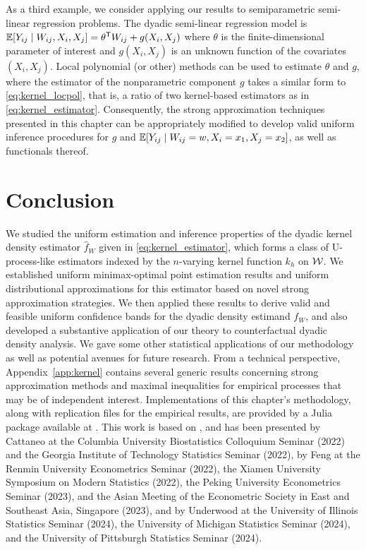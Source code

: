 As a third example, we consider applying our results to semiparametric
semi-linear regression problems. The dyadic semi-linear regression model is
$\mathbb{E}[Y_{i j} \mid W_{i j}, X_i, X_j] = \theta^{\mathsf{T}} W_{i j} + g(X_i, X_j)$
where $\theta$ is the finite-dimensional parameter of interest
and $g(X_i, X_j)$ is an unknown function of the covariates $(X_i, X_j)$.
Local polynomial (or other) methods can be used to estimate $\theta$ and $g$,
where the estimator of the nonparametric component $g$ takes a similar form to
\eqref{eq:kernel_locpol}, that is, a ratio of two kernel-based estimators as in
\eqref{eq:kernel_estimator}. Consequently, the strong approximation techniques
presented in this chapter can be appropriately modified to develop valid
uniform inference procedures for $g$ and
$\mathbb{E}[Y_{i j} \mid W_{i j}=w, X_i=x_1, X_j=x_2]$, as well as functionals thereof.

\section{Conclusion}
\label{sec:kernel_conclusion}

We studied the uniform estimation and inference properties of the dyadic kernel
density estimator $\hat{f}_W$ given in \eqref{eq:kernel_estimator}, which forms
a class of U-process-like estimators indexed by the $n$-varying kernel function
$k_h$ on $\mathcal{W}$. We established uniform minimax-optimal point estimation results
and uniform distributional approximations for this estimator based on novel
strong approximation strategies. We then applied these results to derive valid
and feasible uniform confidence bands for the dyadic density estimand $f_W$,
and also developed a substantive application of our theory to counterfactual
dyadic density analysis. We gave some other statistical applications of our
methodology as well as potential avenues for future research. From a technical
perspective, Appendix~\ref{app:kernel} contains several generic results
concerning strong approximation methods and maximal inequalities for empirical
processes that may be of independent interest. Implementations of this
chapter's methodology, along with replication files for the empirical results,
are provided by a Julia package available at
.
This work is based on \citet{cattaneo2024uniform},
and has been presented by Cattaneo at
the Columbia University Biostatistics Colloquium Seminar (2022)
and the Georgia Institute of Technology Statistics Seminar (2022),
by Feng at
the Renmin University Econometrics Seminar (2022),
the Xiamen University Symposium on Modern Statistics (2022),
the Peking University Econometrics Seminar (2023),
and the Asian Meeting of the Econometric Society
in East and Southeast Asia, Singapore (2023),
and by Underwood at the University of Illinois Statistics Seminar (2024),
the University of Michigan Statistics Seminar (2024), and the University of
Pittsburgh Statistics Seminar (2024).
